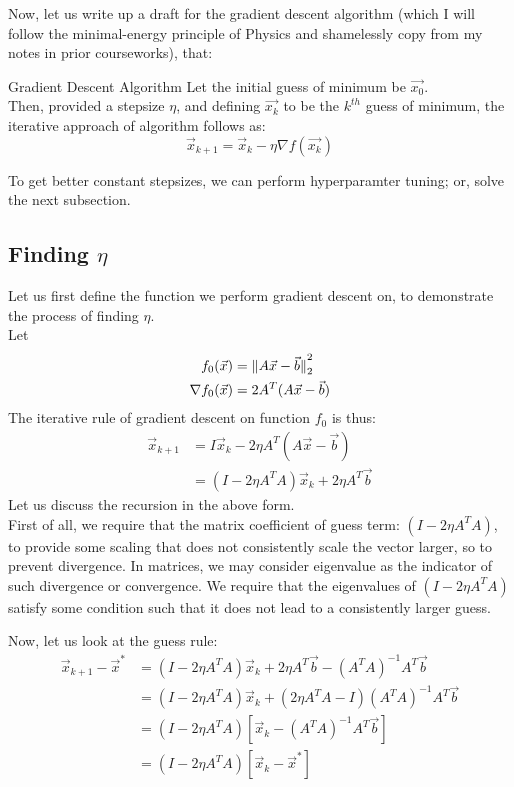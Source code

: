 Now, let us write up a draft for the gradient descent algorithm (which I will follow the minimal-energy principle of Physics and shamelessly copy from my notes in prior courseworks), that:
\begin{ln-define}{Gradient Descent Algorithm}{}
    Let the initial guess of minimum be $\vec{x_0}$. \\
    Then, provided a stepsize $\eta$, and defining $\vec{x_k}$ to be the $k^{th}$ guess of minimum, the iterative approach of algorithm follows as:
    \[
        \vec{x}_{k + 1} = \vec{x}_k - \eta \nabla f(\vec{x_k})
    \]
\end{ln-define}
To get better constant stepsizes, we can perform hyperparamter tuning; or, solve the next subsection.

\subsection{Finding $\eta$}
Let us first define the function we perform gradient descent on, to demonstrate the process of finding $\eta$. \\
Let
\begin{align*}
    f_0 (\vec{x}) &= \pnorm[2]{A \vec{x} - \vec{b}}{2} \\
    \nabla f_0 (\vec{x}) &= 2 A^T (A \vec{x} - \vec{b})
\end{align*}
The iterative rule of gradient descent on function $f_0$ is thus:
\begin{align*}
    \vec{x}_{k + 1}
    &= I \vec{x}_k - 2 \eta A^T (A \vec{x} - \vec{b}) \\
    &= (I - 2 \eta A^T A) \vec{x}_k + 2 \eta A^T \vec{b}
\end{align*}
Let us discuss the recursion in the above form. \\
First of all, we require that the matrix coefficient of guess term: $(I - 2 \eta A^T A)$, to provide some scaling that does not consistently scale the vector larger, so to prevent divergence.
In matrices, we may consider eigenvalue as the indicator of such divergence or convergence. We require that the eigenvalues of $(I - 2 \eta A^T A)$ satisfy some condition such that it does not lead to a consistently larger guess.
\par
Now, let us look at the guess rule:
\begin{align*}
    \vec{x}_{k + 1} - \vec{x}^*
    &= (I - 2 \eta A^T A) \vec{x}_k + 2 \eta A^T \vec{b} - {(A^T A)}^{-1} A^T \vec{b} \\
    &= (I - 2 \eta A^T A) \vec{x}_k + (2 \eta A^T A - I) {(A^T A)}^{-1} A^T \vec{b} \\
    &= (I - 2 \eta A^T A) [\vec{x}_k - {(A^T A)}^{-1} A^T \vec{b}] \\
    &= (I - 2 \eta A^T A) [\vec{x}_k - \vec{x}^*]
\end{align*}
